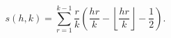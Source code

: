 \[s(h,k)=\sum_{r=1}^{k-1}\frac{r}{k}\left(\frac{hr}{k}-\left\lfloor\frac{hr}{k}%
\right\rfloor-\frac{1}{2}\right).\]